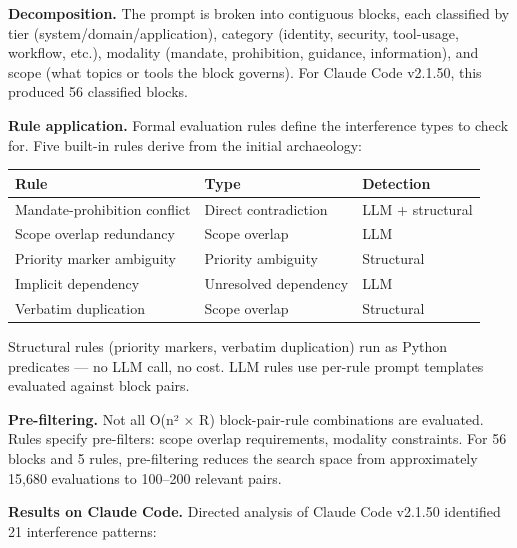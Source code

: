\textbf{Decomposition.} The prompt is broken into contiguous blocks,
each classified by tier (system/domain/application), category (identity,
security, tool-usage, workflow, etc.), modality (mandate, prohibition,
guidance, information), and scope (what topics or tools the block
governs). For Claude Code v2.1.50, this produced 56 classified blocks.

\textbf{Rule application.} Formal evaluation rules define the
interference types to check for. Five built-in rules derive from the
initial archaeology:

\begin{table}[t]
\small
\begin{tabular}{@{}lll@{}}
\toprule
Rule & Type & Detection \\
\midrule
Mandate-prohibition conflict & Direct contradiction & LLM + structural \\
Scope overlap redundancy & Scope overlap & LLM \\
Priority marker ambiguity & Priority ambiguity & Structural \\
Implicit dependency & Unresolved dependency & LLM \\
Verbatim duplication & Scope overlap & Structural \\
\bottomrule
\end{tabular}
\end{table}

Structural rules (priority markers, verbatim duplication) run as Python
predicates --- no LLM call, no cost. LLM rules use per-rule prompt
templates evaluated against block pairs.

\textbf{Pre-filtering.} Not all O(n² × R) block-pair-rule combinations
are evaluated. Rules specify pre-filters: scope overlap requirements,
modality constraints. For 56 blocks and 5 rules, pre-filtering reduces
the search space from approximately 15,680 evaluations to 100--200
relevant pairs.

\textbf{Results on Claude Code.} Directed analysis of Claude Code
v2.1.50 identified 21 interference patterns:

